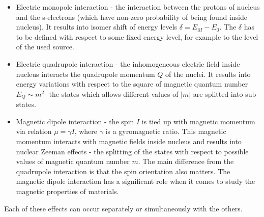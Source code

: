 \begin{itemize}
\item Electric monopole interaction - the interaction between the protons of nucleus and the s-electrons (which have non-zero probability of being found inside nucleus). It results into isomer shift of energy levels $\delta = E_M - E_0$. The $\delta$ has to be defined with respect to some fixed energy level, for example to the level of the used source.
\item Electric quadrupole interaction - the inhomogeneous electric field inside nucleus interacts the quadrupole momentum $Q$ of the nuclei. It results into energy variations with respect to the square of magnetic quantum number $E_Q \sim m^{2}$- the states which allows different values of $|m|$ are splitted into sub-states.

\item Magnetic dipole interaction - the spin $I$ is tied up with magnetic momentum via relation $\mu = \gamma I$, where $\gamma$ is a gyromagnetic ratio. This magnetic momentum interacts with magnetic fields inside nucleus and results into nuclear Zeeman effects - the splitting of the states with respect to possible values of magnetic quantum number $m$. The main difference from the quadrupole interaction is that the spin orientation also matters. The magnetic dipole interaction has a significant role when it comes to study the magnetic properties of materials.
\end{itemize}

Each of these effects can occur separately or simultaneously with the others.






